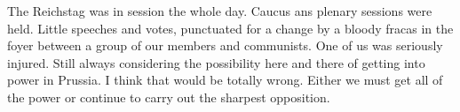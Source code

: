 The Reichstag was in session the whole day. Caucus ans plenary sessions were held. Little speeches and votes, punctuated for a change by a bloody fracas in the foyer between a group of our members and communists. One of us was seriously injured. Still always considering the possibility here and there of getting into power in Prussia. I think that would be totally wrong. Either we must get all of the power or continue to carry out the sharpest opposition.

